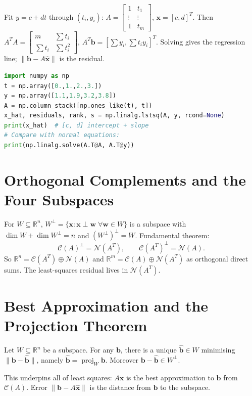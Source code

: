 \begin{example}
Fit $y=c+dt$ through $(t_i,y_i)$: $A=\begin{bmatrix}1&t_1\\\vdots&\vdots\\1&t_m\end{bmatrix}$, $\mathbf{x}=[c,d]^T$. Then $A^TA=\begin{bmatrix}m&\sum t_i\\\sum t_i&\sum t_i^2\end{bmatrix}$, $A^T\mathbf{b}=[\sum y_i,\sum t_iy_i]^T$. Solving gives the regression line; $\|\mathbf{b}-A\hat{\mathbf{x}}\|$ is the residual.
\begin{lstlisting}[language=Python]
import numpy as np
t = np.array([0.,1.,2.,3.])
y = np.array([1.1,1.9,3.2,3.8])
A = np.column_stack([np.ones_like(t), t])
x_hat, residuals, rank, s = np.linalg.lstsq(A, y, rcond=None)
print(x_hat)  # [c, d] intercept + slope
# Compare with normal equations:
print(np.linalg.solve(A.T@A, A.T@y))
\end{lstlisting}
\end{example}


\section{Orthogonal Complements and the Four Subspaces}
\label{sec:ortho-complement}
For $W\subseteq\mathbb{R}^n$, $W^\perp=\{\mathbf{x}:\mathbf{x}\perp\mathbf{w}\;\forall\mathbf{w}\in W\}$ is a subspace with $\dim W+\dim W^\perp=n$ and $(W^\perp)^\perp=W$. Fundamental theorem:
\[
  \mathcal{C}(A)^\perp=\mathcal{N}(A^T),\qquad \mathcal{C}(A^T)^\perp=\mathcal{N}(A).
\]
So $\mathbb{R}^n=\mathcal{C}(A^T)\oplus\mathcal{N}(A)$ and $\mathbb{R}^m=\mathcal{C}(A)\oplus\mathcal{N}(A^T)$ as orthogonal direct sums. The least-squares residual lives in $\mathcal{N}(A^T)$.

\section{Best Approximation and the Projection Theorem}
\label{sec:best-approx}
\begin{theorem}
Let $W\subseteq\mathbb{R}^n$ be a subspace. For any $\mathbf{b}$, there is a unique $\hat{\mathbf{b}}\in W$ minimising $\|\mathbf{b}-\hat{\mathbf{b}}\|$, namely $\hat{\mathbf{b}}=\operatorname{proj}_W\mathbf{b}$. Moreover $\mathbf{b}-\hat{\mathbf{b}}\in W^\perp$.
\end{theorem}
This underpins all of least squares: $A\hat{\mathbf{x}}$ is the best approximation to $\mathbf{b}$ from $\mathcal{C}(A)$. Error $\|\mathbf{b}-A\hat{\mathbf{x}}\|$ is the distance from $\mathbf{b}$ to the subspace.

